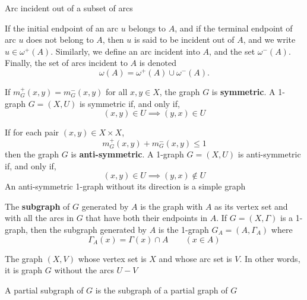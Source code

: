 \documentclass[aspectratio=169]{beamer}
\begin{document}
\begin{frame}{Arc incident out of a subset of arcs}
	\begin{definition}
		If the initial endpoint of an arc $u$ belongs to $A$, and if the terminal endpoint of arc $u$ does not belong to $A$, then $u$ is said to be incident out of $A$, and we write $u\in\omega^+(A)$.
		Similarly, we define an arc incident into $A$, and the set $\omega^-(A)$.
		Finally, the set of arcs incident to $A$ is denoted
		\[
		\omega(A) = \omega^+(A)\cup\omega^-(A).
		\]
	\end{definition}
\end{frame}

\begin{frame}
	\begin{definition}
		If $m_G^+(x,y)=m_G^-(x,y)$ for all $x,y\in X$, the graph $G$ is
		\textbf{symmetric}. A 1-graph $G=(X,U)$ is symmetric if, and only if,
		\[
		(x,y)\in U\implies (y,x)\in U
		\]
	\end{definition}
	\vfill
	\begin{definition}
		If for each pair $(x,y)\in X\times X$,
		\[
		m_G^+(x,y)+m_G^-(x,y)\leq 1
		\]
		then the graph $G$ is \textbf{anti-symmetric}. A 1-graph $G=(X,U)$ is anti-symmetric if, and only if,
		\[
		(x,y)\in U\implies (y,x)\not\in U
		\]
		An anti-symmetric 1-graph without its direction is a simple graph
	\end{definition}
\end{frame}

\begin{frame}
	\begin{definition}
		The \textbf{subgraph} of $G$ generated by $A$ is the graph with $A$ as its vertex set and with all the arcs in $G$ that have both their endpoints in $A$. If $G=(X,\Gamma)$ is a 1-graph, then the subgraph generated by $A$ is the 1-graph $G_A=(A,\Gamma_A)$ where
		\[
		\Gamma_A(x)=\Gamma(x)\cap A\qquad (x\in A)
		\]
	\end{definition}
	\vfill
	\begin{definition}
		\label{def:partial_graph}
		The graph $(X,V)$ whose vertex set is $X$ and whose arc set is $V$. 
		In other words, it is graph $G$ without the arcs $U-V$
	\end{definition}
	\vfill
	\begin{definition}
		A partial subgraph of $G$ is the subgraph of a partial graph of $G$
	\end{definition}
\end{frame}
\end{document}
